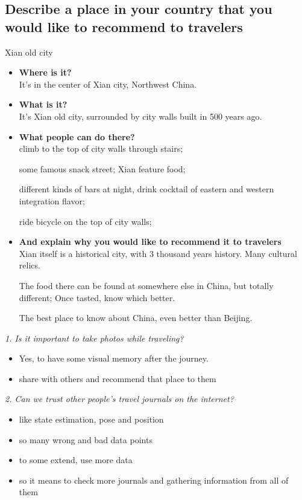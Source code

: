 \documentclass[conference]{IEEEtran}
\begin{document}
\subsection{Describe a place in your country that you would like to recommend to
travelers}
Xian old city
\begin{itemize}
    \item \textbf{Where is it?}\\
    It's in the center of Xian city, Northwest China.
    \item \textbf{What is it?}\\
    It's Xian old city, surrounded by city walls built in 500 years ago.
    \item \textbf{What people can do there?}\\
    climb to the top of city walls through stairs;

    some famous snack street; Xian feature food;

    different kinds of bars at night, drink cocktail of eastern and western integration flavor;
    
    ride bicycle on the top of city walls;
    \item \textbf{And explain why you would like to recommend it to travelers}\\
    Xian itself is a historical city, with 3 thousand years history.
    Many cultural relics.

    The food there can be found at somewhere else in China, but totally different; Once tasted, know which better.

    The best place to know about China, even better than Beijing.
\end{itemize}

\textit{1. Is it important to take photos while traveling?}
\begin{itemize}
    \item Yes, to have some visual memory after the journey.
    \item share with others and recommend that place to them
\end{itemize}

\textit{2. Can we trust other people's travel journals on the internet?}
\begin{itemize}
    \item like state estimation, pose and position
    \item so many wrong and bad data points
    \item to some extend, use more data
    \item so it means to check more journals and gathering information from all of them 
\end{itemize}
\end{document}
